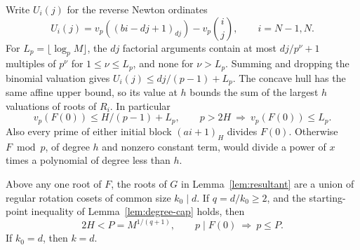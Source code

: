 Write \(U_i(j)\) for the reverse Newton ordinates
\[
 U_i(j)=v_p((bi-dj+1)_{dj})-v_p\binom ij,\qquad i=N-1,N.
\]
For \(L_p=\lfloor\log_p M\rfloor\), the \(dj\) factorial
arguments contain at most \(dj/p^\nu+1\) multiples of \(p^\nu\)
for \(1\le\nu\le L_p\), and none for \(\nu>L_p\).
Summing and dropping the binomial valuation gives
\(U_i(j)\le dj/(p-1)+L_p\). The concave hull has the
same affine upper bound, so its value at \(h\) bounds the
sum of the largest \(h\) valuations of roots of \(R_i\).
In particular
\begin{equation}\label{eq:norm-affine}
 v_p(F(0))\le H/(p-1)+L_p,\qquad
 p>2H\ \Longrightarrow\ v_p(F(0))\le L_p.
\end{equation}
Also every prime of either initial block \((ai+1)_H\)
divides \(F(0)\). Otherwise \(F\bmod p\), of degree \(h\) and
nonzero constant term, would divide a power of \(x\) times
a polynomial of degree less than \(h\).

\begin{lemma}\label{lem:kummer}
Above any one root of \(F\), the roots of \(G\) in
Lemma~\ref{lem:resultant} are a union of regular rotation cosets
of common size \(k_0\mid d\). If \(q=d/k_0\ge2\), and the
starting-point inequality of Lemma~\ref{lem:degree-cap} holds,
then
\begin{equation}\label{eq:kummer-support}
 2H<P=M^{1/(q+1)},\qquad p\mid F(0)\ \Longrightarrow\ p\le P.
\end{equation}
If \(k_0=d\), then \(k=d\).
\end{lemma}

